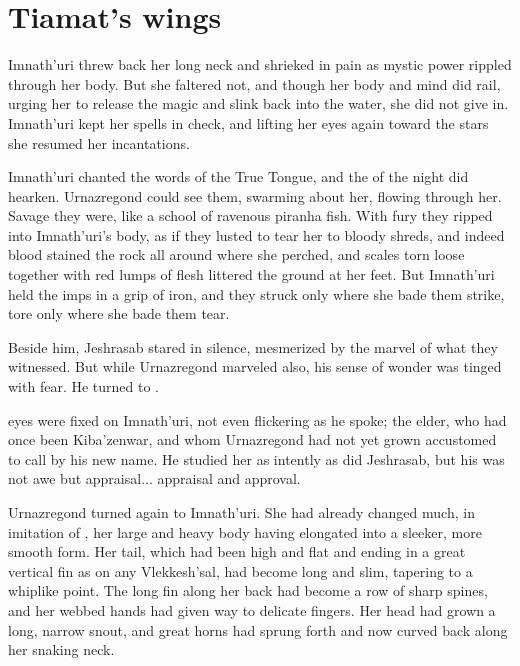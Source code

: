 \section{Tiamat's wings}

Imnath'uri threw back her long neck and shrieked in pain as mystic power rippled through her body. 
But she faltered not, and though her body and mind did rail, urging her to release the magic and slink back into the water, she did not give in.
Imnath'uri kept her spells in check, and lifting her eyes again toward the stars she resumed her incantations. %

 Imnath'uri chanted the words of the True Tongue, and the \daemons{} of the night did hearken. Urnazregond could see them, swarming about her, flowing through her. Savage they were, like a school of ravenous piranha fish. With fury they ripped into Imnath'uri's body, as if they lusted to tear her to bloody shreds, and indeed blood stained the rock all around where she perched, and scales torn loose together with red lumps of flesh littered the ground at her feet. But Imnath'uri held the imps in a grip of iron, and they struck only where she bade them strike, tore only where she bade them tear. 

Beside him, Jeshrasab stared in silence, mesmerized by the marvel of what they witnessed. But while Urnazregond marveled also, his sense of wonder was tinged with fear. He turned to \HesodN. 

 \HesodNz{} eyes were fixed on Imnath'uri, not even flickering as he spoke; \HesodN{} the elder, who had once been Kiba'zenwar, and whom Urnazregond had not yet grown accustomed to call by his new name. 
He studied her as intently as did Jeshrasab, but his was not awe but appraisal... appraisal and approval. 

Urnazregond turned again to Imnath'uri. She had already changed much, in imitation of \HesodN, her large and heavy body having elongated into a sleeker, more smooth form. Her tail, which had been high and flat and ending in a great vertical fin as on any Vlekkesh'sal, had become long and slim, tapering to a whiplike point. The long fin along her back had become a row of sharp spines, and her webbed hands had given way to delicate fingers. Her head had grown a long, narrow snout, and great horns had sprung forth and now curved back along her snaking neck. 

